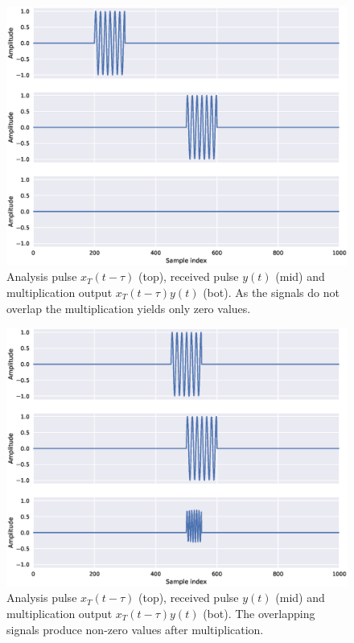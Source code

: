 \begin{figure}[h]
	\centering
	\includegraphics[scale=0.5]{figs_temp/mixing0}
	\caption{Analysis pulse $x_T(t-\tau)$ (top), received pulse $y(t)$ (mid) and multiplication output $x_T(t-\tau)y(t)$ (bot). As the signals do not overlap the multiplication yields only zero values.}
	\label{fig:mix0}
\end{figure}

\begin{figure}[h]
	\centering
	\includegraphics[scale=0.5]{figs_temp/mixing1}
	\caption{Analysis pulse $x_T(t-\tau)$ (top), received pulse $y(t)$ (mid) and multiplication output $x_T(t-\tau)y(t)$ (bot). The overlapping signals produce non-zero values after multiplication.}
	\label{fig:mix1}
\end{figure}

